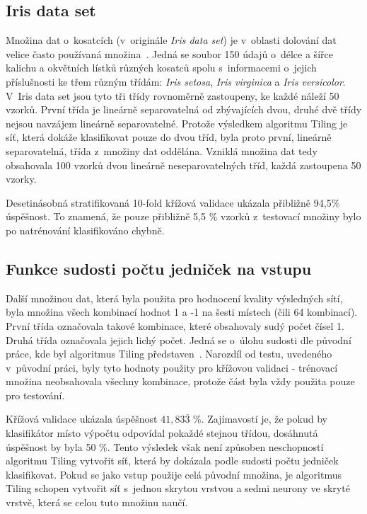 \documentclass[a4paper, 11pt]{article}
\begin{document}
\subsection*{Iris data set}\label{iristest}
Množina dat o~kosatcích (v~originále \emph{Iris data set}) je v~oblasti dolování dat velice často používaná množina~\cite{iris}. Jedná se soubor 150 údajů o~délce a šířce kalichu a okvětních lístků různých kosatců spolu s~informacemi o~jejich příslušnosti ke třem různým třídám: \emph{Iris setosa}, \emph{Iris virginica} a \emph{Iris versicolor}. V~Iris data set jsou tyto tři třídy rovnoměrně zastoupeny, ke každé náleží 50 vzorků. První třída je lineárně separovatelná od zbývajících dvou, druhé dvě třídy nejsou navzájem lineárně separovatelné. Protože výsledkem algoritmu Tiling je síť, která dokáže klasifikovat pouze do dvou tříd, byla proto první, lineárně separovatelná, třída z~množiny dat oddělána. Vzniklá množina dat tedy obsahovala 100 vzorků dvou lineárně neseparovatelných tříd, každá zastoupena 50 vzorky.

Desetinásobná stratifikovaná 10-fold křížová validace ukázala přibližně 94{,}5\% úspěšnost. To znamená, že pouze přibližně 5{,}5 \% vzorků z~testovací množiny bylo po natrénování klasifikováno chybně.

\subsection*{Funkce sudosti počtu jedniček na vstupu}\label{sudost}
Další množinou dat, která byla použita pro hodnocení kvality výsledných sítí, byla množina všech kombinací hodnot 1 a -1 na šesti místech (čili 64 kombinací). První třída označovala takové kombinace, které obsahovaly sudý počet čísel 1. Druhá třída označovala jejich lichý počet. Jedná se o~úlohu sudosti dle původní práce, kde byl algoritmus Tiling představen~\cite{mezard}. Narozdíl od testu, uvedeného v~původní práci, byly tyto hodnoty použity pro křížovou validaci - trénovací množina neobsahovala všechny kombinace, protože část byla vždy použita pouze pro testování.

Křížová validace ukázala úspěšnost $41{,}83\overline{3}$ \%. Zajímavostí je, že pokud by klasifikátor místo výpočtu odpovídal pokaždé stejnou třídou, dosáhnutá úspěšnost by byla 50 \%. Tento výsledek však není způsoben neschopností algoritmu Tiling vytvořit síť, která by dokázala podle sudosti počtu jedniček klasifikovat. Pokud se jako vstup použije celá původní množina, je algoritmus Tiling schopen vytvořit síť s~jednou skrytou vrstvou a sedmi neurony ve skryté vrstvě, která se celou tuto množinu naučí.
\end{document}

